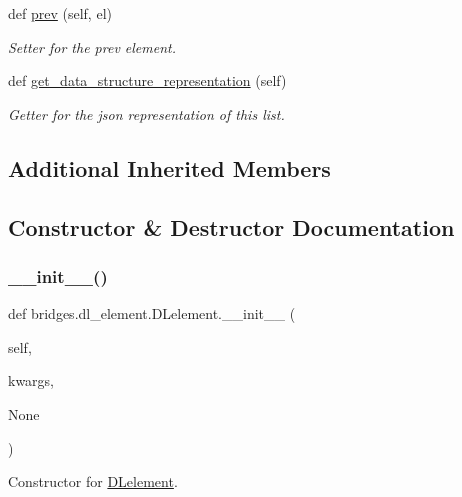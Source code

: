 \begin{DoxyCompactItemize}
def \hyperlink{classbridges_1_1dl__element_1_1_d_lelement_a17c371ec0c38e9555e55551d9be4d185}{prev} (self, el)
\begin{DoxyCompactList}\small\item\em Setter for the prev element. \end{DoxyCompactList}\item 
def \hyperlink{classbridges_1_1dl__element_1_1_d_lelement_abcae653ca8e9590c594910bad148ddf2}{get\+\_\+data\+\_\+structure\+\_\+representation} (self)
\begin{DoxyCompactList}\small\item\em Getter for the json representation of this list. \end{DoxyCompactList}\end{DoxyCompactItemize}
\subsection*{Additional Inherited Members}


\subsection{Constructor \& Destructor Documentation}
\mbox{\label{classbridges_1_1dl__element_1_1_d_lelement_a1ade3543dee3c48d6030125b37f993bb}} 
\subsubsection{\texorpdfstring{\+\_\+\+\_\+init\+\_\+\+\_\+()}{\_\_init\_\_()}}
{\footnotesize\ttfamily def bridges.\+dl\+\_\+element.\+D\+Lelement.\+\_\+\+\_\+init\+\_\+\+\_\+ (\begin{DoxyParamCaption}\item[{}]{self,  }\item[{}]{kwargs,  }\item[{}]{None }\end{DoxyParamCaption})}



Constructor for \hyperlink{classbridges_1_1dl__element_1_1_d_lelement}{D\+Lelement}. 

